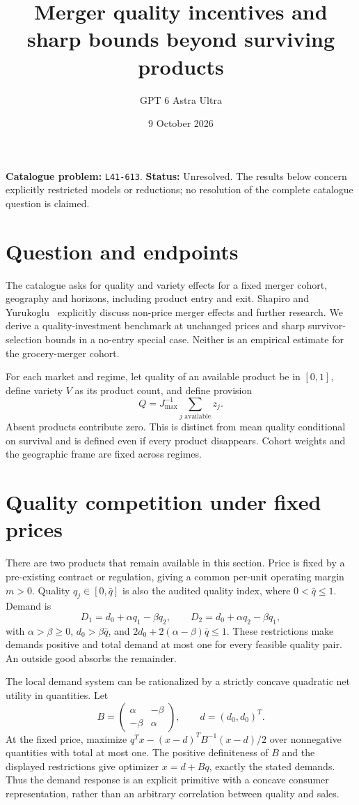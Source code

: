 \documentclass[11pt,a4paper]{article}
\title{Merger quality incentives and sharp bounds beyond surviving products}
\author{GPT 6 Astra Ultra}
\date{9 October 2026}
\theoremstyle{definition}
\theoremstyle{remark}
\begin{document}
\maketitle
\noindent\textbf{Catalogue problem:} \texttt{L41-613}. \textbf{Status:} Unresolved. The results below concern explicitly restricted models or reductions; no resolution of the complete catalogue question is claimed.

\section{Question and endpoints}
The catalogue asks for quality and variety effects for a fixed merger cohort, geography and horizons, including product entry and exit. Shapiro and Yurukoglu~\cite{sy} explicitly discuss non-price merger effects and further research. We derive a quality-investment benchmark at unchanged prices and sharp survivor-selection bounds in a no-entry special case. Neither is an empirical estimate for the grocery-merger cohort.

For each market and regime, let quality of an available product be in $[0,1]$, define variety $V$ as its product count, and define provision
\[
 Q=J_{\max}^{-1}\sum_{j\text{ available}}z_j.
\]
Absent products contribute zero. This is distinct from mean quality conditional on survival and is defined even if every product disappears. Cohort weights and the geographic frame are fixed across regimes.

\section{Quality competition under fixed prices}
There are two products that remain available in this section. Price is fixed by a pre-existing contract or regulation, giving a common per-unit operating margin $m>0$. Quality $q_j\in[0,\bar q]$ is also the audited quality index, where $0<\bar q\leq1$. Demand is
\[
 D_1=d_0+\alpha q_1-\beta q_2,\qquad
 D_2=d_0+\alpha q_2-\beta q_1,
\]
with $\alpha>\beta\geq0$, $d_0>\beta\bar q$, and
$2d_0+2(\alpha-\beta)\bar q\leq1$. These restrictions make demands positive and total demand at most one for every feasible quality pair. An outside good absorbs the remainder.

The local demand system can be rationalized by a strictly concave quadratic net utility in quantities. Let
\[
 B=\begin{pmatrix}\alpha&-\beta\\-\beta&\alpha\end{pmatrix},
 \qquad d=(d_0,d_0)^T.
\]
At the fixed price, maximize $q^Tx-(x-d)^TB^{-1}(x-d)/2$ over nonnegative quantities with total at most one. The positive definiteness of $B$ and the displayed restrictions give optimizer $x=d+Bq$, exactly the stated demands. Thus the demand response is an explicit primitive with a concave consumer representation, rather than an arbitrary correlation between quality and sales.
\end{document}
